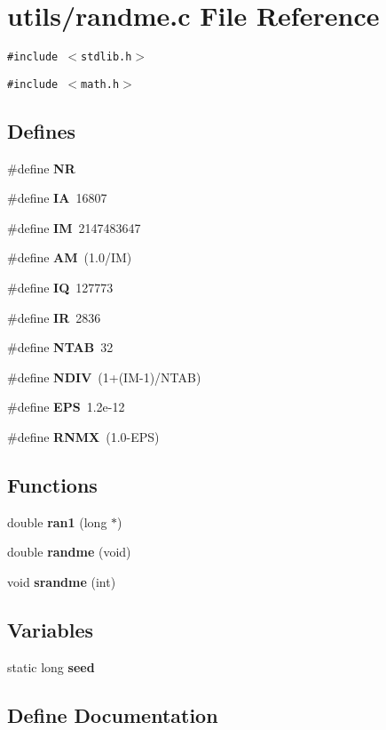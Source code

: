 \section{utils/randme.c File Reference}
\label{randme_8c}
{\tt \#include $<$stdlib.h$>$}\par
{\tt \#include $<$math.h$>$}\par
\subsection*{Defines}
\begin{CompactItemize}
\item 
\#define {\bf NR}
\item 
\#define {\bf IA}~16807
\item 
\#define {\bf IM}~2147483647
\item 
\#define {\bf AM}~(1.0/IM)
\item 
\#define {\bf IQ}~127773
\item 
\#define {\bf IR}~2836
\item 
\#define {\bf NTAB}~32
\item 
\#define {\bf NDIV}~(1+(IM-1)/NTAB)
\item 
\#define {\bf EPS}~1.2e-12
\item 
\#define {\bf RNMX}~(1.0-EPS)
\end{CompactItemize}
\subsection*{Functions}
\begin{CompactItemize}
\item 
double {\bf ran1} (long $\ast$)
\item 
double {\bf randme} (void)
\item 
void {\bf srandme} (int)
\end{CompactItemize}
\subsection*{Variables}
\begin{CompactItemize}
\item 
static long {\bf seed}
\end{CompactItemize}


\subsection{Define Documentation}
